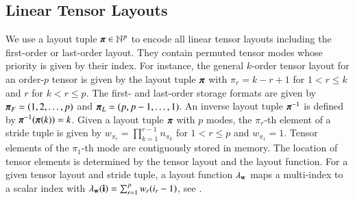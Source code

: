 \subsection{Linear Tensor Layouts}
\label{sec:preliminaries:layout}
We use a layout tuple $\boldsymbol{\pi} \in \mathbb{N}^p$ to encode all linear tensor layouts including the first-order or last-order layout.
They contain permuted tensor modes whose priority is given by their index.
For instance, the general $k$-order tensor layout for an order-$p$ tensor is given by the layout tuple $\boldsymbol{\pi}$ with $\pi_r = k-r+1$ for $1 < r \leq k$ and $r$ for $k < r \leq p$.
The first- and last-order storage formats are given by $\boldsymbol{\pi}_F = (1,2,\dots,p)$ and $\boldsymbol{\pi}_{L} = (p,p-1,\dots,1)$.
An inverse layout tuple $\boldsymbol{\pi}^{-1}$ is defined by $\boldsymbol{\pi}^{-1}(\boldsymbol{\pi}(k)) = k$.
Given a layout tuple $\boldsymbol{\pi}$ with $p$ modes, the $\pi_r$-th element of a stride tuple is given by $w_{\pi_r} = \prod_{k=1}^{r-1} n_{\pi_k}$ for $1 < r \leq p$ and $w_{\pi_1} = 1$.
Tensor elements of the $\pi_1$-th mode are contiguously stored in memory.
The location of tensor elements is determined by the tensor layout and the layout function.
For a given tensor layout and stride tuple, a layout function $\lambda_{\mathbf{w}}$ maps a multi-index to a scalar index with $\lambda_{\mathbf{w}}(\mathbf{i}) = \sum_{r=1}^p w_r (i_r-1)$, see \cite{bassoy:2018:fast,pawlowski:2019:morton.tensor.computations}.

